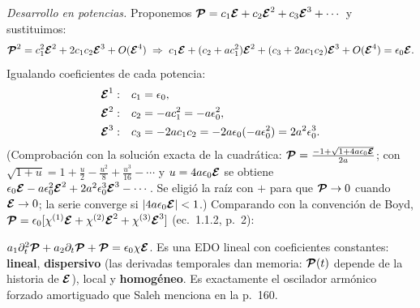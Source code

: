 \emph{Desarrollo en potencias.} Proponemos $\Pc=c_1\Ec+c_2\Ec^2+c_3\Ec^3+\cdots$ y sustituimos:
\begin{equation*}
\Pc^2=c_1^2\Ec^2+2c_1c_2\Ec^3+O(\Ec^4)
\;\Rightarrow\;
c_1\Ec+(c_2+ac_1^2)\Ec^2+(c_3+2ac_1c_2)\Ec^3+O(\Ec^4)=\epsilon_0\Ec .
\end{equation*}
Igualando coeficientes de cada potencia:
\begin{align*}
\Ec^1:&\quad c_1=\epsilon_0,\\
\Ec^2:&\quad c_2=-ac_1^2=-a\epsilon_0^2,\\
\Ec^3:&\quad c_3=-2ac_1c_2=-2a\epsilon_0(-a\epsilon_0^2)=2a^2\epsilon_0^3 .
\end{align*}
(Comprobación con la solución exacta de la cuadrática:
$\Pc=\frac{-1+\sqrt{1+4a\epsilon_0\Ec}}{2a}$; con $\sqrt{1+u}=1+\frac u2-\frac{u^2}{8}+\frac{u^3}{16}-\cdots$ y
$u=4a\epsilon_0\Ec$ se obtiene $\epsilon_0\Ec-a\epsilon_0^2\Ec^2+2a^2\epsilon_0^3\Ec^3-\cdots$. Se eligió la
raíz con $+$ para que $\Pc\to0$ cuando $\Ec\to0$; la serie converge si $|4a\epsilon_0\Ec|<1$.)
Comparando con la convención de Boyd, $\Pc=\epsilon_0[\chi^{(1)}\Ec+\chi^{(2)}\Ec^2+\chi^{(3)}\Ec^3]$
(ec.~1.1.2, p.~2):

 $a_1\partial_t^2\Pc+a_2\partial_t\Pc+\Pc=\epsilon_0\chi\Ec$. Es una EDO lineal con coeficientes
constantes: \textbf{lineal}, \textbf{dispersivo} (las derivadas temporales dan memoria: $\Pc(t)$
depende de la historia de $\Ec$), local y \textbf{homogéneo}. Es exactamente el oscilador
armónico forzado amortiguado que Saleh menciona en la p.~160.

